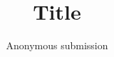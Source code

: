 \documentclass[conference]{IEEEtran}
\begin{document}
\title{Title}
\author{Anonymous submission}

\maketitle

\thispagestyle{plain}
\pagestyle{plain}


\IEEEpeerreviewmaketitle







\end{document}
